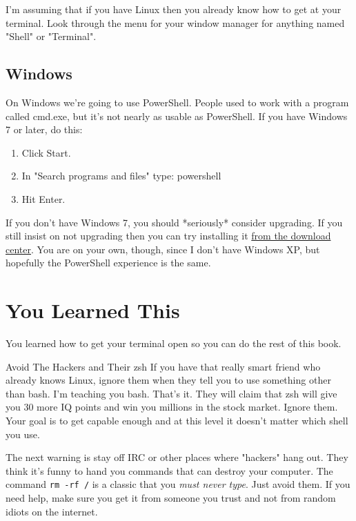 I'm assuming that if you have Linux then you already know how to get at your terminal.  Look through the
menu for your window manager for anything named "Shell" or "Terminal".

\subsection{Windows}

On Windows we're going to use PowerShell. People used to work with a program called cmd.exe, but it's not nearly as usable as PowerShell. If you have Windows 7 or later, do this:

\begin{enumerate}
\item Click Start.
\item In "Search programs and files" type: powershell
\item Hit Enter.
\end{enumerate}

If you don't have Windows 7, you should *seriously* consider upgrading. If you
still insist on not upgrading then you can try installing it
\href{http://www.microsoft.com/download/en/details.aspx?displaylang=en&id=16818}{from
the download center}. You are on your own, though, since I don't have Windows
XP, but hopefully the PowerShell experience is the same. 

\section{You Learned This}

You learned how to get your terminal open so you can do the rest of this book.

\begin{aside}{Avoid The Hackers and Their zsh}
If you have that really smart friend who already knows Linux, ignore them when they tell you to use something
other than bash.  I'm teaching you bash.  That's it.  They will claim that zsh will give you 30 more IQ points
and win you millions in the stock market.  Ignore them.  Your goal is to get capable enough and at this level
it doesn't matter which shell you use.

The next warning is stay off IRC or other places where "hackers" hang out.  They think it's funny to hand you
commands that can destroy your computer.  The command \verb|rm -rf /| is a classic that you \emph{must never type}.
Just avoid them.  If you need help, make sure you get it from someone you trust and not from random idiots on the
internet.
\end{aside}

